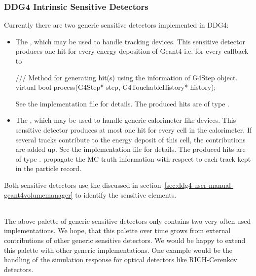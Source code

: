 \documentclass[10pt,a4paper]{article}
\begin{document}
\subsubsection{DDG4 Intrinsic Sensitive Detectors}
\noindent
Currently there are two generic sensitive detectors implemented in DDG4:
\begin{itemize}\itemcompact
\item The , which may be used to handle tracking devices.
  This sensitive detector produces one hit for every energy deposition of Geant4
  i.e. for every callback to 
\begin{unnumberedcode}
  /// Method for generating hit(s) using the information of G4Step object.
  virtual bool process(G4Step* step, G4TouchableHistory* history);
\end{unnumberedcode}
  See the implementation file 
  for details. The produced hits are of type 
  .

\item The , which may be used to handle 
  generic calorimeter like devices.
  This sensitive detector produces at most one hit for every cell in the calorimeter.
  If several tracks contribute to the energy deposit of this cell, the contributions
  are added up.
  See the implementation file 
  for details. The produced hits are of type 
  .
  propagate the MC truth information with respect to each track kept in the 
  particle record.
\end{itemize}

\noindent
Both sensitive detectors use the  discussed in 
section~\ref{sec:ddg4-user-manual-geant4volumemanager} to identify the sensitive elements.

\noindent
{}\\
The above palette of generic sensitive detectors only contains two very
often used implementations. We hope, that this palette over time grows from
external contributions of other generic sensitive detectors. We would be happy 
to extend this palette with other generic implementations. One example would
be the handling of the simulation response for optical detectors like RICH-Cerenkov
detectors.
\end{document}
